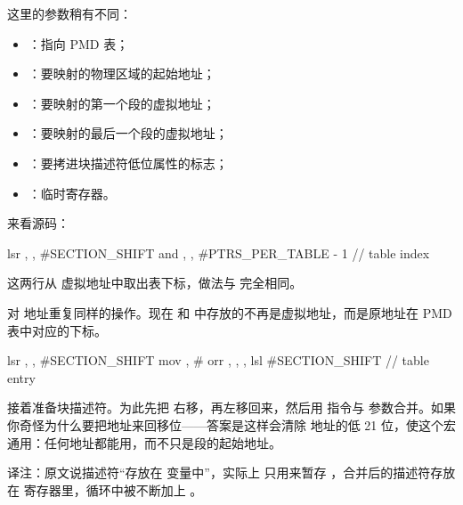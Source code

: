 这里的参数稍有不同：

\begin{itemize}
  \item {}：指向 PMD 表；
  \item {}：要映射的物理区域的起始地址；
  \item {}：要映射的第一个段的虚拟地址；
  \item {}：要映射的最后一个段的虚拟地址；
  \item {}：要拷进块描述符低位属性的标志；
  \item {}：临时寄存器。
\end{itemize}

来看源码：

\begin{asmcode}
	lsr	\start, \start, #SECTION_SHIFT
	and	\start, \start, #PTRS_PER_TABLE - 1			// table index
\end{asmcode}

这两行从  虚拟地址中取出表下标，做法与  完全相同。


对  地址重复同样的操作。现在  和  中存放的不再是虚拟地址，而是原地址在 PMD 表中对应的下标。

\begin{asmcode}
	lsr	\phys, \phys, #SECTION_SHIFT
	mov	, #\flags
	orr	\phys, , \phys, lsl #SECTION_SHIFT			// table entry
\end{asmcode}

接着准备块描述符。为此先把  右移，再左移回来，然后用  指令与  参数合并。如果你奇怪为什么要把地址来回移位——答案是这样会清除  地址的低 21 位，使这个宏通用：任何地址都能用，而不只是段的起始地址。

\begin{remark}
  译注：原文说描述符“存放在  变量中”，实际上  只用来暂存 ，合并后的描述符存放在  寄存器里，循环中被不断加上 。
\end{remark}


